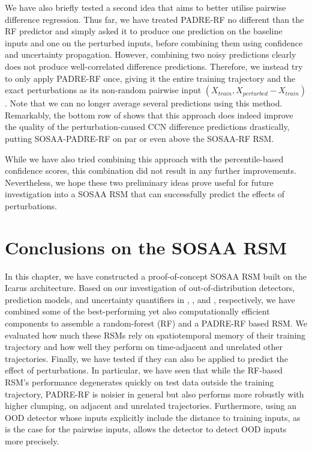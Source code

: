\newpar We have also briefly tested a second idea that aims to better utilise pairwise difference regression. Thus far, we have treated PADRE-RF no different than the RF predictor and simply asked it to produce one prediction on the baseline inputs and one on the perturbed inputs, before combining them using confidence and uncertainty propagation. However, combining two noisy predictions clearly does not produce well-correlated difference predictions. Therefore, we instead try to only apply PADRE-RF once, giving it the entire training trajectory and the exact perturbations as its non-random pairwise input $(X_{train}, X_{perturbed} - X_{train})$. Note that we can no longer average several predictions using this method. Remarkably, the bottom row of  shows that this approach does indeed improve the quality of the perturbation-caused CCN difference predictions drastically, putting SOSAA-PADRE-RF on par or even above the SOSAA-RF RSM.

\newpar While we have also tried combining this approach with the percentile-based confidence scores, this combination did not result in any further improvements. Nevertheless, we hope these two preliminary ideas prove useful for future investigation into a SOSAA RSM that can successfully predict the effects of perturbations.

\section{Conclusions on the SOSAA RSM} \label{txt:sosaa-rsm-conclusions}

In this chapter, we have constructed a proof-of-concept SOSAA RSM built on the Icarus architecture. Based on our investigation of out-of-distribution detectors, prediction models, and uncertainty quantifiers in , , and , respectively, we have combined some of the best-performing yet also computationally efficient components to assemble a random-forest (RF) and a PADRE-RF based RSM. We evaluated how much these RSMs rely on spatiotemporal memory of their training trajectory and how well they perform on time-adjacent and unrelated other trajectories. Finally, we have tested if they can also be applied to predict the effect of perturbations. In particular, we have seen that while the RF-based RSM's performance degenerates quickly on test data outside the training trajectory, PADRE-RF is noisier in general but also performs more robustly with higher clumping, on adjacent and unrelated trajectories. Furthermore, using an OOD detector whose inputs explicitly include the distance to training inputs, as is the case for the pairwise inputs, allows the detector to detect OOD inputs more precisely.

